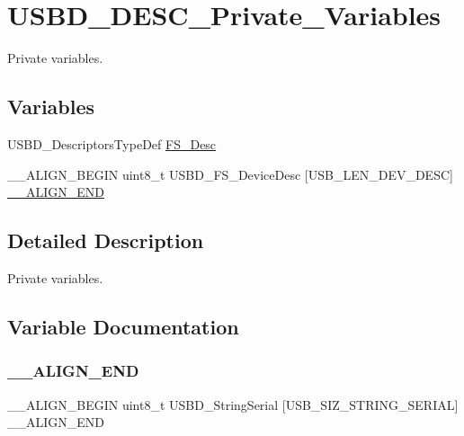 \hypertarget{group__USBD__DESC__Private__Variables}{}\section{U\+S\+B\+D\+\_\+\+D\+E\+S\+C\+\_\+\+Private\+\_\+\+Variables}
\label{group__USBD__DESC__Private__Variables}


Private variables.  


\subsection*{Variables}
\begin{DoxyCompactItemize}
\item 
U\+S\+B\+D\+\_\+\+Descriptors\+Type\+Def \hyperlink{group__USBD__DESC__Private__Variables_gae36d67393118d9d8531a8d633e23a797}{F\+S\+\_\+\+Desc}
\item 
\+\_\+\+\_\+\+A\+L\+I\+G\+N\+\_\+\+B\+E\+G\+IN uint8\+\_\+t U\+S\+B\+D\+\_\+\+F\+S\+\_\+\+Device\+Desc \mbox{[}U\+S\+B\+\_\+\+L\+E\+N\+\_\+\+D\+E\+V\+\_\+\+D\+E\+SC\mbox{]} \hyperlink{group__USBD__DESC__Private__Variables_ga542bfea0b6dcf06e06a505bdc49c7e04}{\+\_\+\+\_\+\+A\+L\+I\+G\+N\+\_\+\+E\+ND}
\end{DoxyCompactItemize}


\subsection{Detailed Description}
Private variables. 



\subsection{Variable Documentation}
\mbox{\label{group__USBD__DESC__Private__Variables_ga542bfea0b6dcf06e06a505bdc49c7e04}} 
\subsubsection{\texorpdfstring{\+\_\+\+\_\+\+A\+L\+I\+G\+N\+\_\+\+E\+ND}{\_\_ALIGN\_END}}
{\footnotesize\ttfamily \+\_\+\+\_\+\+A\+L\+I\+G\+N\+\_\+\+B\+E\+G\+IN uint8\+\_\+t U\+S\+B\+D\+\_\+\+String\+Serial \mbox{[}U\+S\+B\+\_\+\+S\+I\+Z\+\_\+\+S\+T\+R\+I\+N\+G\+\_\+\+S\+E\+R\+I\+AL\mbox{]} \+\_\+\+\_\+\+A\+L\+I\+G\+N\+\_\+\+E\+ND}

